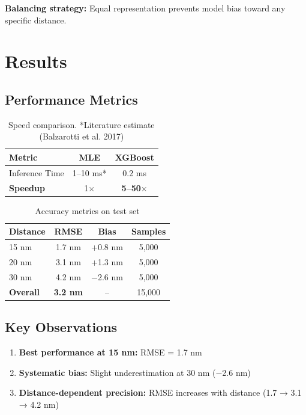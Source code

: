\documentclass[a4paper,11pt]{article}
\begin{document}
\textbf{Balancing strategy:} Equal representation prevents model bias toward any specific distance.

\section{Results}

\subsection{Performance Metrics}

\begin{table}[h]
\centering
\begin{tabular}{lcc}
\toprule
\textbf{Metric} & \textbf{MLE} & \textbf{XGBoost} \\
\midrule
Inference Time & 1--10 ms* & 0.2 ms \\
\textbf{Speedup} & 1$\times$ & \textbf{5--50$\times$} \\
\bottomrule
\end{tabular}
\caption{Speed comparison. *Literature estimate (Balzarotti et al. 2017)}
\end{table}

\begin{table}[h]
\centering
\begin{tabular}{lccc}
\toprule
\textbf{Distance} & \textbf{RMSE} & \textbf{Bias} & \textbf{Samples} \\
\midrule
15 nm & 1.7 nm & +0.8 nm & 5,000 \\
20 nm & 3.1 nm & +1.3 nm & 5,000 \\
30 nm & 4.2 nm & $-$2.6 nm & 5,000 \\
\midrule
\textbf{Overall} & \textbf{3.2 nm} & -- & 15,000 \\
\bottomrule
\end{tabular}
\caption{Accuracy metrics on test set}
\end{table}

\subsection{Key Observations}

\begin{enumerate}[leftmargin=*]
    \item \textbf{Best performance at 15 nm:} RMSE = 1.7 nm
    \item \textbf{Systematic bias:} Slight underestimation at 30 nm ($-$2.6 nm)
    \item \textbf{Distance-dependent precision:} RMSE increases with distance (1.7 → 3.1 → 4.2 nm)
\end{enumerate}
\end{document}
